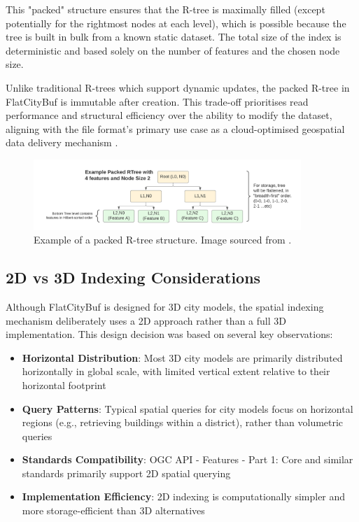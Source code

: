 This "packed" structure ensures that the R-tree is maximally filled (except potentially for the rightmost nodes at each level), which is possible because the tree is built in bulk from a known static dataset. The total size of the index is deterministic and based solely on the number of features and the chosen node size.

Unlike traditional R-trees which support dynamic updates, the packed R-tree in FlatCityBuf is immutable after creation. This trade-off prioritises read performance and structural efficiency over the ability to modify the dataset, aligning with the file format's primary use case as a cloud-optimised geospatial data delivery mechanism \citep{horance_2022_overview}.

\begin{figure}[ht]
  \centering
  \includegraphics[width=0.9\textwidth]{./figs/methodology/packed_rtree.png}
  \caption{Example of a packed R-tree structure. Image sourced from \cite{horance_2022_overview}.}
  \label{fig:packed_rtree}
\end{figure}
\subsection{2D vs 3D Indexing Considerations}
\label{methodology:spatial_index:2d_vs_3d_indexing}

Although FlatCityBuf is designed for 3D city models, the spatial indexing mechanism deliberately uses a 2D approach rather than a full 3D implementation. This design decision was based on several key observations:

\begin{itemize}
  \item \textbf{Horizontal Distribution}: Most 3D city models are primarily distributed horizontally in global scale, with limited vertical extent relative to their horizontal footprint
  \item \textbf{Query Patterns}: Typical spatial queries for city models focus on horizontal regions (e.g., retrieving buildings within a district), rather than volumetric queries
  \item \textbf{Standards Compatibility}: OGC API - Features - Part 1: Core \citep{ogc_api_2019} and similar standards primarily support 2D spatial querying
  \item \textbf{Implementation Efficiency}: 2D indexing is computationally simpler and more storage-efficient than 3D alternatives
\end{itemize}

